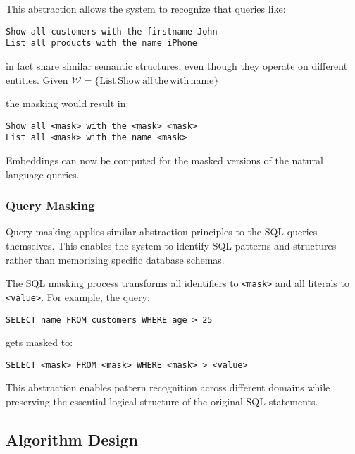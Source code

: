 This abstraction allows the system to recognize that queries like:

\begin{verbatim}
Show all customers with the firstname John
List all products with the name iPhone
\end{verbatim}

in fact share similar semantic structures, even though they operate on different entities.
Given $\mathcal{W} = \{\text{List}\, \text{Show}\, \text{all}\, \text{the}\, \text{with}\, \text{name}\}$

the masking would result in:

\begin{verbatim}
Show all <mask> with the <mask> <mask>
List all <mask> with the name <mask>
\end{verbatim}

Embeddings can now be computed for the masked versions of the natural language queries.

\subsubsection{Query Masking}

Query masking applies similar abstraction principles to the SQL queries themselves.
This enables the system to identify SQL patterns and structures rather than
memorizing specific database schemas.

The SQL masking process transforms all identifiers to \texttt{<mask>} and all literals
to \texttt{<value>}. For example, the query:

\begin{verbatim}
SELECT name FROM customers WHERE age > 25
\end{verbatim}

gets masked to:

\begin{verbatim}
SELECT <mask> FROM <mask> WHERE <mask> > <value>
\end{verbatim}

This abstraction enables pattern recognition across different domains while
preserving the essential logical structure of the original SQL statements.









\subsection{Algorithm Design}

